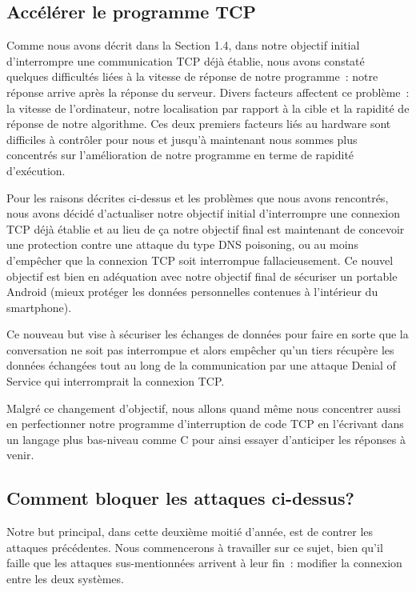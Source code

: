 \documentclass[a4paper, 12pt,twoside]{article}
\begin{document}
    \subsection{Accélérer le programme TCP}%

    Comme nous avons décrit dans la Section 1.4,  dans notre objectif initial d'interrompre une communication TCP déjà établie, nous avons constaté quelques difficultés liées à la vitesse de réponse de notre programme~: notre réponse arrive après la réponse du serveur. Divers facteurs affectent ce problème~: la vitesse de l'ordinateur, notre localisation par rapport à la cible et la rapidité de réponse de notre algorithme. Ces deux premiers facteurs liés au hardware sont difficiles à contrôler pour nous et jusqu'à maintenant nous sommes plus concentrés sur l'amélioration de notre programme en terme de rapidité d'exécution.

    Pour les raisons décrites ci-dessus et les problèmes que nous avons rencontrés, nous avons décidé d'actualiser notre objectif initial d'interrompre une connexion TCP déjà établie et au lieu de ça notre objectif final est maintenant de concevoir une protection contre une attaque du type DNS poisoning, ou au moins d'empêcher que la connexion TCP soit interrompue fallacieusement. Ce nouvel objectif est bien en adéquation avec notre objectif final de sécuriser un portable Android (mieux protéger les données personnelles contenues à l'intérieur du smartphone).

    Ce nouveau but vise à sécuriser les échanges de données pour faire en sorte que la conversation ne soit pas interrompue et alors empêcher qu'un tiers récupère les données échangées tout au long de la communication par une attaque Denial of Service qui interromprait la connexion TCP.

    Malgré ce changement d'objectif, nous allons quand même nous concentrer aussi en perfectionner notre programme d'interruption de code TCP en l'écrivant dans un langage plus bas-niveau comme C pour ainsi essayer d'anticiper les réponses à venir.
    
    \subsection{Comment bloquer les attaques ci-dessus?}

    Notre but principal, dans cette deuxième moitié d'année, est de contrer les attaques précédentes. Nous commencerons à travailler sur ce sujet, bien qu'il faille que les attaques sus-mentionnées arrivent à leur fin~: modifier la connexion entre les deux systèmes.
\end{document}

